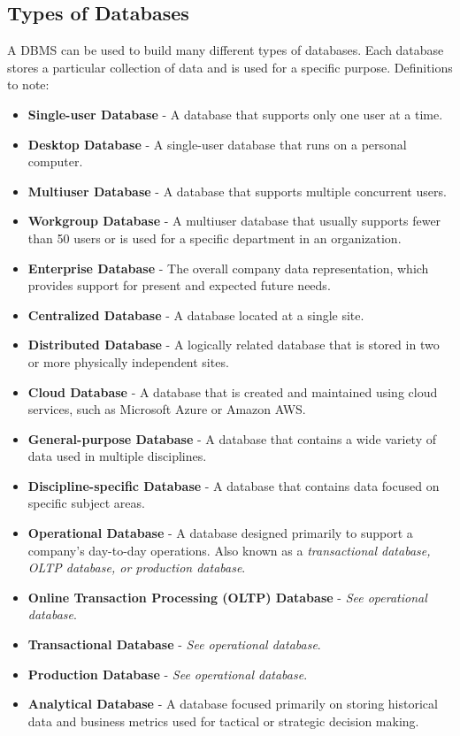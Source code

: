 \documentclass[a4paper, 12pt, titlepage]{report}
\begin{document}
\subsection{Types of Databases}
A DBMS can be used to build many different types of databases. Each database stores a particular collection of data and is used for a specific purpose.
Definitions to note:
\begin{itemize}
\item \textbf{Single-user Database} - A database that supports only one user at a time.
\item \textbf{Desktop Database} - A single-user database that runs on a personal computer.
\item \textbf{Multiuser Database} - A database that supports multiple concurrent users.
\item \textbf{Workgroup Database} - A multiuser database that usually supports fewer than 50 users or is used for a specific department in an organization.
\item \textbf{Enterprise Database} - The overall company data representation, which provides support for present and expected future needs.
\item \textbf{Centralized Database} - A database located at a single site.
\item \textbf{Distributed Database} - A logically related database that is stored in two or more physically independent sites.
\item \textbf{Cloud Database} - A database that is created and maintained using cloud services, such as Microsoft Azure or Amazon AWS.
\item \textbf{General-purpose Database} - A database that contains a wide variety of data used in multiple disciplines.
\item \textbf{Discipline-specific Database} - A database that contains data focused on specific subject areas.
\item \textbf{Operational Database} - A database designed primarily to support a company’s day-to-day operations. Also known as a \emph{transactional database, OLTP database, or production database}.
\item \textbf{Online Transaction Processing (OLTP) Database} - \emph{See operational database}.
\item \textbf{Transactional Database} - \emph{See operational database}.
\item \textbf{Production Database} - \emph{See operational database}. 
\item \textbf{Analytical Database} - A database focused primarily on storing historical data and business metrics used for tactical or strategic decision making. 

\end{itemize}
\end{document}
